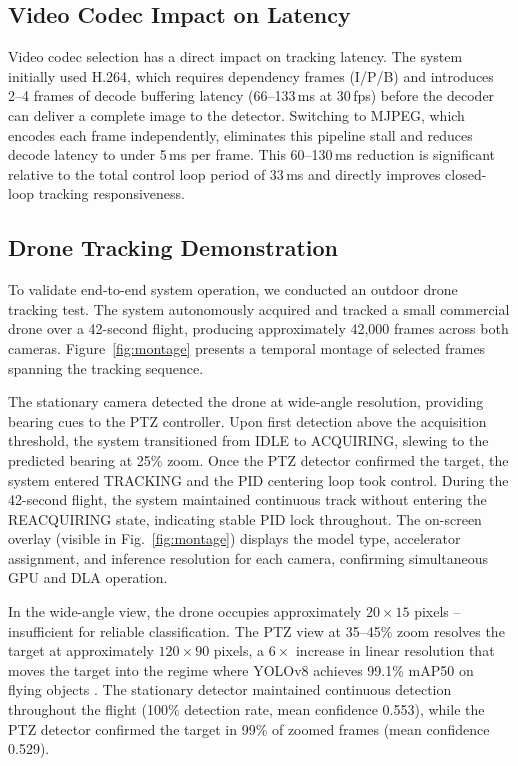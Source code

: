 \documentclass[conf]{new-aiaa}
\begin{document}
\subsection{Video Codec Impact on Latency}
Video codec selection has a direct impact on tracking latency. The system initially used H.264, which requires dependency frames (I/P/B) and introduces 2--4 frames of decode buffering latency (66--133\,ms at 30\,fps) before the decoder can deliver a complete image to the detector. Switching to MJPEG, which encodes each frame independently, eliminates this pipeline stall and reduces decode latency to under 5\,ms per frame. This 60--130\,ms reduction is significant relative to the total control loop period of 33\,ms and directly improves closed-loop tracking responsiveness.

\subsection{Drone Tracking Demonstration}
To validate end-to-end system operation, we conducted an outdoor drone tracking test. The system autonomously acquired and tracked a small commercial drone over a 42-second flight, producing approximately 42,000 frames across both cameras. Figure~\ref{fig:montage} presents a temporal montage of selected frames spanning the tracking sequence.

The stationary camera detected the drone at wide-angle resolution, providing bearing cues to the PTZ controller. Upon first detection above the acquisition threshold, the system transitioned from IDLE to ACQUIRING, slewing to the predicted bearing at 25\% zoom. Once the PTZ detector confirmed the target, the system entered TRACKING and the PID centering loop took control. During the 42-second flight, the system maintained continuous track without entering the REACQUIRING state, indicating stable PID lock throughout. The on-screen overlay (visible in Fig.~\ref{fig:montage}) displays the model type, accelerator assignment, and inference resolution for each camera, confirming simultaneous GPU and DLA operation.

In the wide-angle view, the drone occupies approximately $20 \times 15$ pixels -- insufficient for reliable classification. The PTZ view at 35--45\% zoom resolves the target at approximately $120 \times 90$ pixels, a $6\times$ increase in linear resolution that moves the target into the regime where YOLOv8 achieves 99.1\% mAP50 on flying objects \cite{Reis2023}. The stationary detector maintained continuous detection throughout the flight (100\% detection rate, mean confidence 0.553), while the PTZ detector confirmed the target in 99\% of zoomed frames (mean confidence 0.529).
\end{document}
